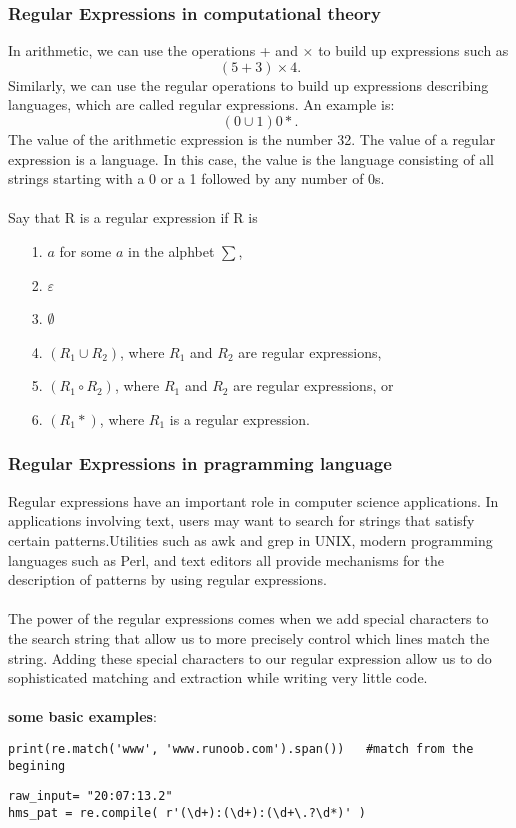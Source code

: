 \documentclass{article}
\begin{document}
\subsubsection{Regular Expressions in computational theory}
In arithmetic, we can use the operations + and $\times$ to build up expressions such as\\
\begin{equation*}
(5+3)\times4.
\end{equation*}
Similarly, we can use the regular operations to build up expressions describing languages, which are called regular expressions. An example is:
\begin{equation*}
(0\cup1)0*.
\end{equation*}
The value of the arithmetic expression is the number 32. The value of a regular expression is a language. 
In this case, the value is the language consisting of all
strings starting with a 0 or a 1 followed by any number of 0s.\\
\\
Say that R is a regular expression if R is
\begin{itemize}
\item[1.] $a$ for some $a$ in the alphbet $\sum$,
\item[2.] $\varepsilon$
\item[3.] $\emptyset$
\item[4.] $(R_1\cup R_2)$, where $R_1$ and  $R_2$ are regular expressions,
\item[5.] $(R_1\circ R_2)$, where $R_1$ and  $R_2$ are regular expressions, or
\item[6.] $(R_1*)$, where $R_1$ is a regular expression.
\end{itemize}


\subsubsection{Regular Expressions in pragramming language}
Regular expressions have an important role in computer science applications.
In applications involving text, users may want to search for strings that satisfy
certain patterns.Utilities such as awk and grep in UNIX, modern programming
languages such as Perl, and text editors all provide mechanisms for the description
of patterns by using regular expressions.\\
\\
The power of the regular expressions comes when we add special characters to
the search string that allow us to more precisely control which lines match the
string. Adding these special characters to our regular expression allow us to do
sophisticated matching and extraction while writing very little code.\\
\\
\textbf{some basic examples}:
\begin{verbatim}
print(re.match('www', 'www.runoob.com').span())   #match from the begining
\end{verbatim}
\begin{verbatim}
raw_input= "20:07:13.2"
hms_pat = re.compile( r'(\d+):(\d+):(\d+\.?\d*)' )  
\end{verbatim}
\end{document}
